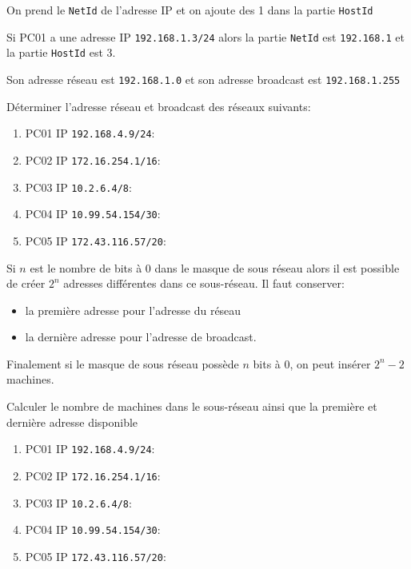 \begin{methode}{}
On prend le \verb+NetId+ de l'adresse IP et on ajoute des 1 dans la partie \verb+HostId+

Si PC01 a une adresse IP \verb+192.168.1.3/24+ alors la partie \verb+NetId+ est \verb+192.168.1+ et la partie \verb+HostId+ est 3.

Son adresse réseau est \verb+192.168.1.0+ et son adresse broadcast est \verb+192.168.1.255+
\end{methode}


\begin{exercice_cours}{}{}
Déterminer l'adresse réseau et broadcast des réseaux suivants:

\begin{enumerate}
    \item PC01 IP \verb+192.168.4.9/24+: \dotfill
    \item PC02 IP \verb+172.16.254.1/16+: \dotfill
    \item PC03 IP \verb+10.2.6.4/8+: \dotfill
    \item PC04 IP \verb+10.99.54.154/30+: \dotfill
    \item PC05 IP \verb+172.43.116.57/20+: \dotfill
\end{enumerate}
\end{exercice_cours}

\begin{propriete}{}
Si $n$ est le nombre de bits à 0 dans le masque de sous réseau alors il est possible de créer $2^n$ adresses différentes dans ce sous-réseau. Il faut conserver: 
\begin{itemize}
    \item la première adresse pour l'adresse du réseau
    \item la dernière adresse pour l'adresse de broadcast.
\end{itemize}

Finalement si le masque de sous réseau possède $n$ bits à 0, on peut insérer \textbf{$2^n-2$} machines.
\end{propriete}

\begin{exercice_cours}[]{}

	Calculer le nombre de machines dans le sous-réseau ainsi que la première et dernière adresse disponible
    \begin{enumerate}
        \item PC01 IP \verb+192.168.4.9/24+: \dotfill
        \item PC02 IP \verb+172.16.254.1/16+: \dotfill
        \item PC03 IP \verb+10.2.6.4/8+: \dotfill
        \item PC04 IP \verb+10.99.54.154/30+: \dotfill
        \item PC05 IP \verb+172.43.116.57/20+: \dotfill
    \end{enumerate}
\end{exercice_cours}

